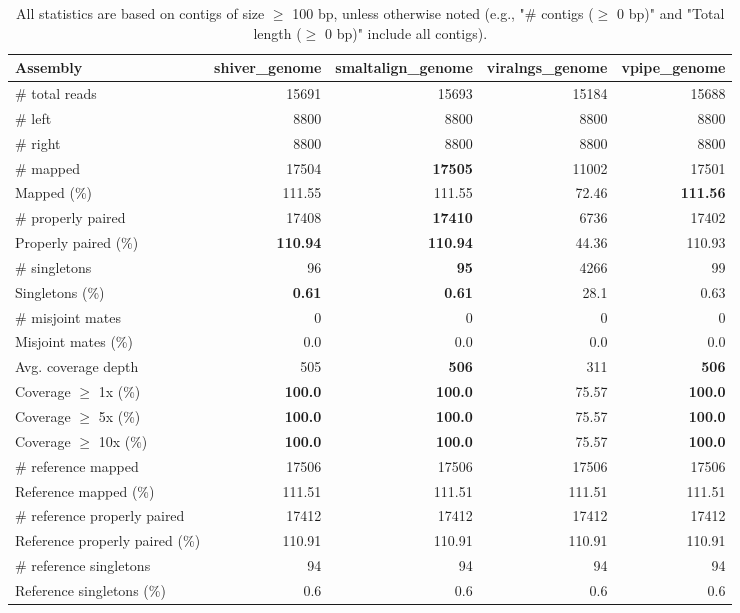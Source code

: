 \documentclass[12pt,a4paper]{article}
\begin{document}
\begin{table}[ht]
\begin{center}
\caption{All statistics are based on contigs of size $\geq$ 100 bp, unless otherwise noted (e.g., "\# contigs ($\geq$ 0 bp)" and "Total length ($\geq$ 0 bp)" include all contigs).}
\begin{tabular}{|l*{4}{|r}|}
\hline
Assembly & shiver\_genome & smaltalign\_genome & viralngs\_genome & vpipe\_genome \\ \hline
\# total reads & 15691 & 15693 & 15184 & 15688 \\ \hline
\# left & 8800 & 8800 & 8800 & 8800 \\ \hline
\# right & 8800 & 8800 & 8800 & 8800 \\ \hline
\# mapped & 17504 & {\bf 17505} & 11002 & 17501 \\ \hline
Mapped (\%) & 111.55 & 111.55 & 72.46 & {\bf 111.56} \\ \hline
\# properly paired & 17408 & {\bf 17410} & 6736 & 17402 \\ \hline
Properly paired (\%) & {\bf 110.94} & {\bf 110.94} & 44.36 & 110.93 \\ \hline
\# singletons & 96 & {\bf 95} & 4266 & 99 \\ \hline
Singletons (\%) & {\bf 0.61} & {\bf 0.61} & 28.1 & 0.63 \\ \hline
\# misjoint mates & 0 & 0 & 0 & 0 \\ \hline
Misjoint mates (\%) & 0.0 & 0.0 & 0.0 & 0.0 \\ \hline
Avg. coverage depth & 505 & {\bf 506} & 311 & {\bf 506} \\ \hline
Coverage $\geq$ 1x (\%) & {\bf 100.0} & {\bf 100.0} & 75.57 & {\bf 100.0} \\ \hline
Coverage $\geq$ 5x (\%) & {\bf 100.0} & {\bf 100.0} & 75.57 & {\bf 100.0} \\ \hline
Coverage $\geq$ 10x (\%) & {\bf 100.0} & {\bf 100.0} & 75.57 & {\bf 100.0} \\ \hline
\# reference mapped & 17506 & 17506 & 17506 & 17506 \\ \hline
Reference mapped (\%) & 111.51 & 111.51 & 111.51 & 111.51 \\ \hline
\# reference properly paired & 17412 & 17412 & 17412 & 17412 \\ \hline
Reference properly paired (\%) & 110.91 & 110.91 & 110.91 & 110.91 \\ \hline
\# reference singletons & 94 & 94 & 94 & 94 \\ \hline
Reference singletons (\%) & 0.6 & 0.6 & 0.6 & 0.6 \\ \hline

\end{tabular}
\end{center}
\end{table}
\end{document}
